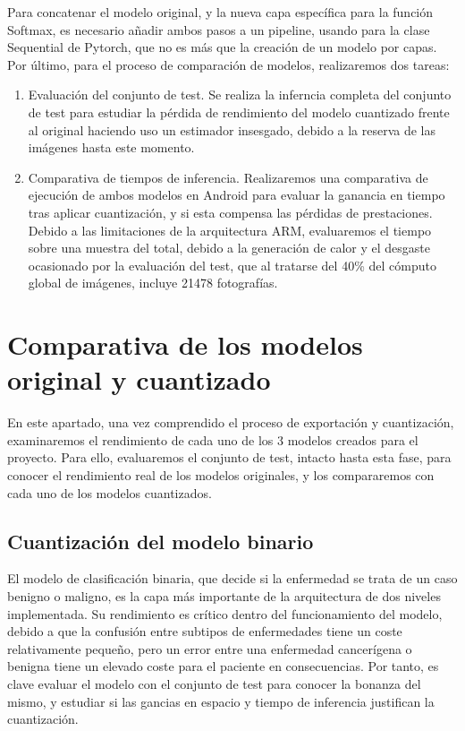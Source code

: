 Para concatenar el modelo original, y la nueva capa específica para la función Softmax, es necesario añadir ambos pasos a un pipeline, usando para la clase Sequential de Pytorch, que no es más que la creación de un modelo por capas.\\

Por último, para el proceso de comparación de modelos, realizaremos dos tareas:
\begin{enumerate}
	\item Evaluación del conjunto de test. Se realiza la inferncia completa del conjunto de test para estudiar la pérdida de rendimiento del modelo cuantizado frente al original haciendo uso un estimador insesgado, debido a la reserva de las imágenes hasta este momento.
	\item Comparativa de tiempos de inferencia. Realizaremos una comparativa de ejecución de ambos modelos en Android para evaluar la ganancia en tiempo tras aplicar cuantización, y si esta compensa las pérdidas de prestaciones. Debido a las limitaciones de la arquitectura ARM, evaluaremos el tiempo sobre una muestra del total, debido a la generación de calor y el desgaste ocasionado por la evaluación del test, que al tratarse del 40\% del cómputo global de imágenes, incluye 21478 fotografías.

\end{enumerate}

\section{Comparativa de los modelos original y cuantizado}

En este apartado, una vez comprendido el proceso de exportación y cuantización, examinaremos el rendimiento de cada uno de los 3 modelos creados para el proyecto. Para ello, evaluaremos el conjunto de test, intacto hasta esta fase, para conocer el rendimiento real de los modelos originales, y los compararemos con cada uno de los modelos cuantizados.

\subsection{Cuantización del modelo binario}

El modelo de clasificación binaria, que decide si la enfermedad se trata de un caso benigno o maligno, es la capa más importante de la arquitectura de dos niveles implementada. Su rendimiento es crítico dentro del funcionamiento del modelo, debido a que la confusión entre subtipos de enfermedades tiene un coste relativamente pequeño, pero un error entre una enfermedad cancerígena o benigna tiene un elevado coste para el paciente en consecuencias. Por tanto, es clave evaluar el modelo con el conjunto de test para conocer la bonanza del mismo, y estudiar si las gancias en espacio y tiempo de inferencia justifican la cuantización.\\

